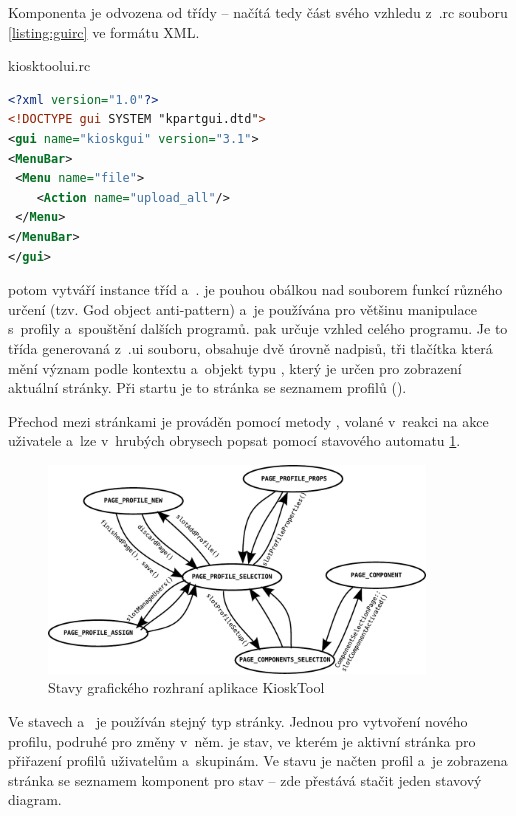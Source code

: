 Komponenta  je odvozena od třídy  -- načítá tedy část svého vzhledu z~.rc souboru \ref{listing:guirc} ve formátu XML.
\begin{mylisting}
\caption{kiosktoolui.rc}
\label{listing:guirc}
\begin{lstlisting}[language=XML]
<?xml version="1.0"?>
<!DOCTYPE gui SYSTEM "kpartgui.dtd">
<gui name="kioskgui" version="3.1">
<MenuBar>
 <Menu name="file">
    <Action name="upload_all"/>
 </Menu>
</MenuBar>
</gui>
\end{lstlisting}
\end{mylisting}

 potom vytváří instance tříd  a~.  je pouhou obálkou nad souborem funkcí různého určení (tzv. God object anti-pattern) a~je používána pro většinu manipulace s~profily a~spouštění dalších programů.  pak určuje vzhled celého programu. Je to třída generovaná z~.ui souboru, obsahuje dvě úrovně nadpisů, tři tlačítka která mění význam podle kontextu a~objekt typu , který je určen pro zobrazení aktuální stránky. Při startu je to stránka se seznamem profilů ().

Přechod mezi stránkami je prováděn pomocí metody , volané v~reakci na akce uživatele a~lze v~hrubých obrysech popsat pomocí stavového automatu \ref{fig:kioskstates}.

\begin{figure}[h]
    \centering
    \includegraphics[width=10cm]{obrazky/stated.pdf}
    \caption{Stavy grafického rozhraní aplikace KioskTool}
    \label{fig:kioskstates}
\end{figure}

Ve stavech  a~ je používán stejný typ stránky. Jednou pro vytvoření nového profilu, podruhé pro změny v~něm.\linebreak {} je stav, ve kterém je aktivní stránka pro přiřazení profilů uživatelům a~skupinám. Ve stavu  je načten profil a~je zobrazena stránka se seznamem komponent pro stav  -- zde přestává stačit jeden stavový diagram.

